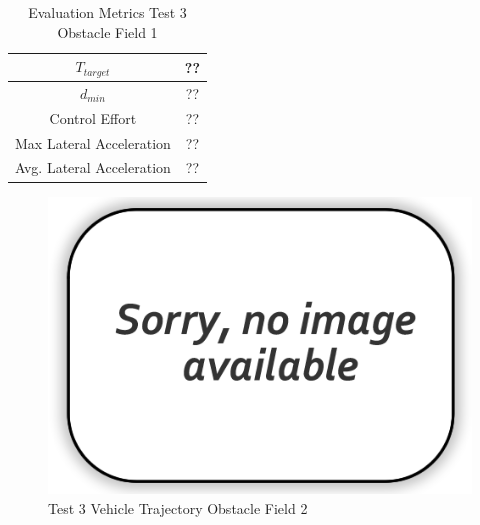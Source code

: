 \documentclass[12pt,twocolumn]{article}
\begin{document}
\begin{table}
\begin{center}
	\begin{tabular}{||c |c||} 
		\hline
		$T_{target}$ & ??\\ 
		\hline
		$d_{min}$ & ??\\
		\hline
		Control Effort & ??\\
		\hline
		Max Lateral Acceleration & ??\\
		\hline
		Avg. Lateral Acceleration & ??\\
		\hline
	\end{tabular}
\end{center}
\caption{Evaluation Metrics Test 3 Obstacle Field 1}
\label{t:EvalTest3Obst1}
\end{table}

\begin{figure}
	\centering
	\includegraphics[width=\columnwidth]{Figs/no-image.png}
	\caption{\small Test 3 Vehicle Trajectory Obstacle Field 2}  
	\label{fig:Test3_Obst2}
\end{figure}
\end{document}

